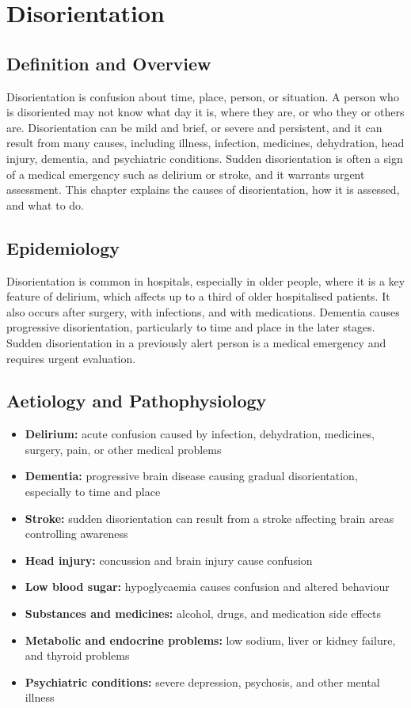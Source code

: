 \chapter{Disorientation}

\section*{Definition and Overview}
Disorientation is confusion about time, place, person, or situation. A person who is disoriented may not know what day it is, where they are, or who they or others are. Disorientation can be mild and brief, or severe and persistent, and it can result from many causes, including illness, infection, medicines, dehydration, head injury, dementia, and psychiatric conditions. Sudden disorientation is often a sign of a medical emergency such as delirium or stroke, and it warrants urgent assessment. This chapter explains the causes of disorientation, how it is assessed, and what to do.

\section*{Epidemiology}
Disorientation is common in hospitals, especially in older people, where it is a key feature of delirium, which affects up to a third of older hospitalised patients. It also occurs after surgery, with infections, and with medications. Dementia causes progressive disorientation, particularly to time and place in the later stages. Sudden disorientation in a previously alert person is a medical emergency and requires urgent evaluation.

\section*{Aetiology and Pathophysiology}
\begin{itemize}
    \item \textbf{Delirium:} acute confusion caused by infection, dehydration, medicines, surgery, pain, or other medical problems
    \item \textbf{Dementia:} progressive brain disease causing gradual disorientation, especially to time and place
    \item \textbf{Stroke:} sudden disorientation can result from a stroke affecting brain areas controlling awareness
    \item \textbf{Head injury:} concussion and brain injury cause confusion
    \item \textbf{Low blood sugar:} hypoglycaemia causes confusion and altered behaviour
    \item \textbf{Substances and medicines:} alcohol, drugs, and medication side effects
    \item \textbf{Metabolic and endocrine problems:} low sodium, liver or kidney failure, and thyroid problems
    \item \textbf{Psychiatric conditions:} severe depression, psychosis, and other mental illness
\end{itemize}

